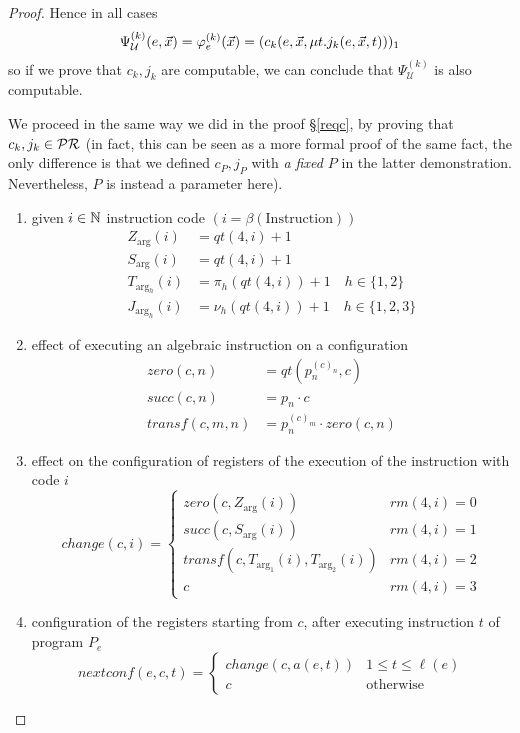 \begin{theorem}
\begin{proof}
    Hence in all cases
    \[\Psi_{\mathcal{U}}^{(k)} (e, \vec{x}) = \varphi_e^{(k)}(\vec{x}) = (c_k(e,\vec{x}, \mu t . j_k(e, \vec{x}, t)))_1\]
    so if we prove that $c_k, j_k$ are computable, we can conclude that
    $\Psi_{\mathcal{U}}^{(k)}$ is also computable. 
    
    We proceed in the
    same way we did in the proof \S\ref{reqc}, by proving that
    $c_k, j_k \in \mathcal{PR}$ (in fact, this can be seen as a more formal
    proof of the same fact, the only difference is that we defined
    $c_P, j_P$ with \emph{a fixed $P$} in the latter demonstration.
    Nevertheless, $P$ is instead a parameter here).

    \newcommand{\uarg}{{\mbox{arg}}}
    \newcommand{\uargh}{{\mbox{arg}_h}}
    \begin{enumerate}[label=(\alph*)]
    \item given $i \in \mathbb{N}$ instruction code $( i = \beta(\mbox{Instruction}))$
      \begin{align*}
        Z_\uarg (i) &= qt(4, i) + 1 \\
        S_\uarg (i) &= qt(4,i) + 1 \\
        T_\uargh(i) &= \pi_h(qt(4,i)) + 1 \quad h \in \{1,2\} \\
        J_\uargh(i) &= \nu_h(qt(4,i)) + 1 \quad h \in \{1,2,3\}
      \end{align*}
    \item effect of executing an algebraic instruction on a configuration
      \begin{align*}
        zero(c,n) &= qt(p_n^{(c)_n}, c) \\
        succ(c,n) &= p_n \cdot c \\
        transf(c,m,n) &= p_n^{(c)_m} \cdot zero(c,n)
      \end{align*}

    \item effect on the configuration of registers of the execution of
      the instruction with code $i$
      \[
        change(c,i) = \begin{cases}
          zero(c, Z_\uarg(i)) & rm(4,i) = 0 \\
          succ(c, S_\uarg(i)) & rm(4,i) = 1 \\
          transf(c, T_{\uarg_1}(i), T_{\uarg_2}(i)) & rm(4,i) = 2 \\
          c & rm(4,i) = 3
      \end{cases}
    \]

  \item configuration of the registers starting from $c$,
    after executing instruction $t$ of program $P_e$ 
    \[
      nextconf(e,c,t) = \begin{cases}
        change(c, a(e,t)) & 1 \leq t \leq \ell(e) \\
        c & \mbox{otherwise}
      \end{cases}
    \]


\end{enumerate}
\end{proof}
\end{theorem}

